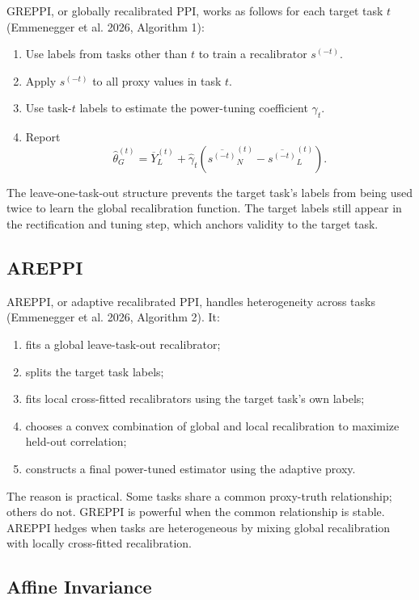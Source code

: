 \documentclass[11pt]{article}
\begin{document}
GREPPI, or globally recalibrated PPI, works as follows for each target task $t$ (Emmenegger et al. 2026, Algorithm 1):
\begin{enumerate}[leftmargin=*]
  \item Use labels from tasks other than $t$ to train a recalibrator $s^{(-t)}$.
  \item Apply $s^{(-t)}$ to all proxy values in task $t$.
  \item Use task-$t$ labels to estimate the power-tuning coefficient $\gamma_t$.
  \item Report
  \[
    \widehat\theta_G^{(t)}
    =
    \overline Y_L^{(t)}
    +
    \widehat\gamma_t
    \left(
      \overline{s^{(-t)}}_N^{(t)}
      -
      \overline{s^{(-t)}}_L^{(t)}
    \right).
  \]
\end{enumerate}
The leave-one-task-out structure prevents the target task's labels from being used twice to learn the global recalibration function. The target labels still appear in the rectification and tuning step, which anchors validity to the target task.

\subsection{AREPPI}

AREPPI, or adaptive recalibrated PPI, handles heterogeneity across tasks (Emmenegger et al. 2026, Algorithm 2). It:
\begin{enumerate}[leftmargin=*]
  \item fits a global leave-task-out recalibrator;
  \item splits the target task labels;
  \item fits local cross-fitted recalibrators using the target task's own labels;
  \item chooses a convex combination of global and local recalibration to maximize held-out correlation;
  \item constructs a final power-tuned estimator using the adaptive proxy.
\end{enumerate}
The reason is practical. Some tasks share a common proxy-truth relationship; others do not. GREPPI is powerful when the common relationship is stable. AREPPI hedges when tasks are heterogeneous by mixing global recalibration with locally cross-fitted recalibration.

\subsection{Affine Invariance}
\end{document}
